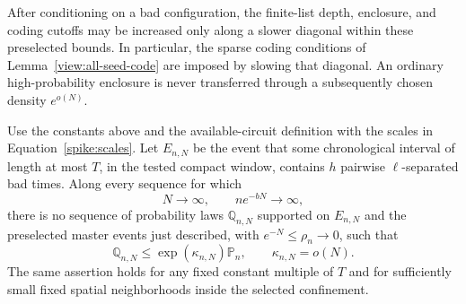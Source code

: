 After conditioning on a bad configuration, the finite-list depth,
enclosure, and coding cutoffs may be increased only along a slower
diagonal within these preselected bounds.  In particular, the sparse
coding conditions of Lemma~\ref{view:all-seed-code} are imposed by
slowing that diagonal.  An ordinary high-probability enclosure is never
transferred through a subsequently chosen density $e^{o(N)}$.

\begin{proposition}\label{spike:circuit-sparsity}
Use the constants above and the available-circuit definition with the
scales in Equation~\eqref{spike:scales}.  Let $E_{n,N}$ be the event that
some chronological interval of length at most $T$, in the tested compact
window, contains $h$ pairwise $\ell$-separated bad times.  Along every
sequence for which
\[
 N\longrightarrow\infty,\qquad n e^{-bN}\longrightarrow\infty,
\]
there is no sequence of probability laws $\mathbb Q_{n,N}$ supported on
$E_{n,N}$ and the preselected master events just described, with
$e^{-N}\le\rho_n\to0$, such that
\begin{equation}\label{spike:selected-law}
 \mathbb Q_{n,N}\le \exp(\kappa_{n,N})\mathbb P_n,
 \qquad \kappa_{n,N}=o(N).
\end{equation}
The same assertion holds for any fixed constant multiple of $T$ and
for sufficiently small fixed spatial neighborhoods inside the selected
confinement.
\end{proposition}

